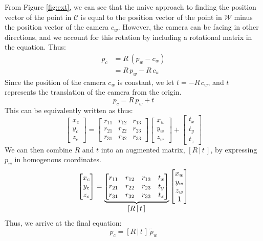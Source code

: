 From Figure \ref{fig:ext}, we can see that the naive approach to finding the position vector of the point in $\mathcal{C}$  is equal to the position vector of the point in $\mathcal{W}$ minus the position vector of the camera $c_w$. However, the camera can be facing in other directions, and we account for this rotation by including a rotational matrix in the equation. Thus:
\begin{align}
    p_c & = R\,(p_w-c_w) \nonumber \\
        & = R\,p_w -R\,c_w
\end{align}
Since the position of the camera $c_w$ is constant, we let $t = -R\,c_w$, and $t$ represents the translation of the camera from the origin.
\begin{equation}
    p_c = R\,p_w + t
\end{equation}
This can be equivalently written as thus:
\begin{equation*}
    \begin{bmatrix}
        x_c \\ y_c \\ z_c
    \end{bmatrix}
    =
    \begin{bmatrix}
        r_{11} & r_{12} & r_{13} \\
        r_{21} & r_{22} & r_{23} \\
        r_{31} & r_{32} & r_{33}
    \end{bmatrix}
    \begin{bmatrix}
        x_w \\ y_w \\ z_w
    \end{bmatrix}
    +
    \begin{bmatrix}
        t_x \\ t_y \\ t_z
    \end{bmatrix}
\end{equation*}
We can then combine $R$ and $t$ into an augmented matrix, $[R\,|\,t\,]$, by expressing $p_w$ in homogenous coordinates.
\begin{equation}
    \begin{bmatrix}
        x_c \\ y_c \\ z_c
    \end{bmatrix}
    =
    \underbrace{
        \begin{bmatrix}
            r_{11} & r_{12} & r_{13} & t_x \\
            r_{21} & r_{22} & r_{23} & t_y \\
            r_{31} & r_{32} & r_{33} & t_z \\
        \end{bmatrix}
    }_{\mathlarger{[R\,|\,t\,]}}
    \begin{bmatrix}
        x_w \\ y_w \\ z_w \\ 1
    \end{bmatrix}
\end{equation}
Thus, we arrive at the final equation:
\begin{equation}
    p_c=[R\,|\,t\,] \,\widetilde{p}_w \label{eq:pc}
\end{equation}

